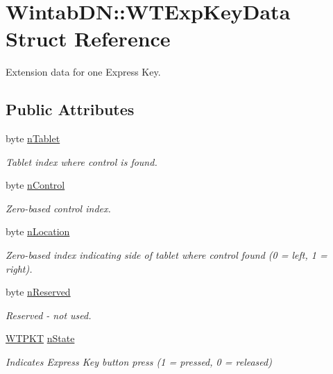 \hypertarget{struct_wintab_d_n_1_1_w_t_exp_key_data}{
\section{WintabDN::WTExpKeyData Struct Reference}
\label{struct_wintab_d_n_1_1_w_t_exp_key_data}
}


Extension data for one Express Key.  


\subsection*{Public Attributes}
\begin{DoxyCompactItemize}
\item 
byte \hyperlink{struct_wintab_d_n_1_1_w_t_exp_key_data_ae3e24d2799a9ea087dd008a29f298b10}{nTablet}
\begin{DoxyCompactList}\small\item\em Tablet index where control is found. \item\end{DoxyCompactList}\item 
byte \hyperlink{struct_wintab_d_n_1_1_w_t_exp_key_data_a3517d9dde32f64a3a936a2f4f0ae8fad}{nControl}
\begin{DoxyCompactList}\small\item\em Zero-\/based control index. \item\end{DoxyCompactList}\item 
byte \hyperlink{struct_wintab_d_n_1_1_w_t_exp_key_data_ab77b69daf1ad64f5e70349072f10ec3a}{nLocation}
\begin{DoxyCompactList}\small\item\em Zero-\/based index indicating side of tablet where control found (0 = left, 1 = right). \item\end{DoxyCompactList}\item 
byte \hyperlink{struct_wintab_d_n_1_1_w_t_exp_key_data_af8ece8d7a372d170113016896b92b0fd}{nReserved}
\begin{DoxyCompactList}\small\item\em Reserved -\/ not used. \item\end{DoxyCompactList}\item 
\hyperlink{class_wintab_d_n_1_1_w_t_p_k_t}{WTPKT} \hyperlink{struct_wintab_d_n_1_1_w_t_exp_key_data_a2be90aaa315c0aa994448b83fb0136f9}{nState}
\begin{DoxyCompactList}\small\item\em Indicates Express Key button press (1 = pressed, 0 = released) \item\end{DoxyCompactList}\end{DoxyCompactItemize}


